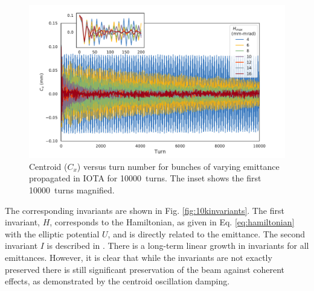 \documentclass[aps,prstab,twocolumn, groupedaddress]{revtex4-1}
\begin{document}
\begin{figure}
	\includegraphics[width=\columnwidth]{centroids_to_10k.pdf}%
	\caption{Centroid ($C_x$) versus turn number for bunches of varying emittance 
	propagated in IOTA for \SI{10000}{turns}. The inset shows the first \SI{10000}{turns} 
	magnified.}
	\label{fig:10kcentroids} 
\end{figure}

The corresponding invariants are shown in Fig. \ref{fig:10kinvariants}. The first invariant, 
$H$, corresponds to the Hamiltonian, as given in Eq. \ref{eq:hamiltonian} with the elliptic 
potential $U$, and is directly related to the emittance. The second invariant $I$ is 
described in \cite{danilovNagaitsev:2010}. There is a long-term linear growth in invariants 
for all emittances. However, it is clear that while the invariants are not exactly preserved 
there is still significant preservation of the beam against coherent effects, as 
demonstrated by the centroid oscillation damping.
\end{document}
